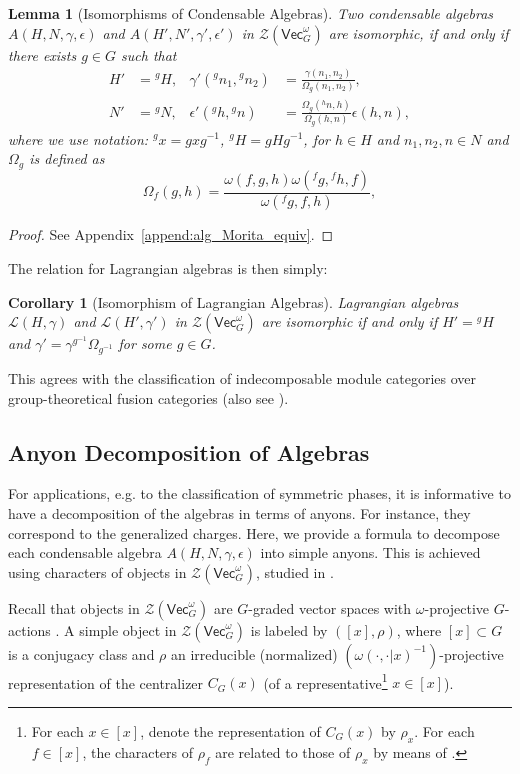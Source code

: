 \documentclass[aps,twocolumn,prx,floatfix,preprintnumbers, nofootinbib,10pt]{revtex4-2}
\numberwithin{equation}{section}
\newtheorem{lemma}[theorem]{Lemma}
\newtheorem{corollary}[theorem]{Corollary}
\theoremstyle{definition}
\newcommand{\be}{\begin{equation}}
\newcommand{\ee}{\end{equation}}
\newcommand{\ba}{\begin{aligned}}
\newcommand{\ea}{\end{aligned}}
\newcommand{\cL}{\mathcal{L}}
\newcommand{\cZ}{\mathcal{Z}}
\renewcommand{\Vec}{\mathsf{Vec}}
\newcommand{\Vect}{\mathsf{Vec}}
\newcommand{\eps}{\epsilon}
\begin{document}
\begin{lemma}[Isomorphisms of Condensable Algebras]
\label{lem:Morita_equiv}
    Two condensable algebras $A(H,N,\gamma,\epsilon)$ and $A(H',N',\gamma',\epsilon')$ in $\cZ(\Vec_G^\omega)$ are isomorphic, if and only if there exists $g\in G$ such that 
    \be\ba 
        H' & = {}^g\!H, & \gamma'({}^g n_1, {}^g n_2) & = \frac{\gamma(n_1,n_2)}{\Omega_g(n_1,n_2)},\\
        N' & = {}^g\!N, & \epsilon'({}^{g}h, {}^{g}n) & =\frac{\Omega_g({}^{h}n,h)}{\Omega_g(h,n)}\epsilon(h,n),\label{eqn:MoritaEq}
    \ea\ee
    where we use notation: ${}^{g}x = gxg^{-1}$, ${}^{g}\!H = gHg^{-1}$, for $h\in H$ and $n_1,n_2,n\in N$ and $\Omega_g$ is defined as 
    \be
    \Omega_f(g,h)=\frac{\omega(f,g,h)\omega({}^{f}\!g,{}^{f}h,f)}{\omega({}^{f}\!g,f,h)}, \label{eq:Omega_f}
    \ee
\end{lemma}
\begin{proof}
    See Appendix~\ref{append:alg_Morita_equiv}.
\end{proof}
The relation for Lagrangian algebras is then simply: 
\begin{corollary}[Isomorphism of Lagrangian Algebras]
    Lagrangian algebras $\cL(H, \gamma)$ and $\cL(H', \gamma')$ in $\cZ(\Vec_G^\omega)$ are isomorphic if and only if $H'={}^{g}\!H$ and  $\gamma'=\gamma^{g^{-1}}\Omega_{g^{-1}}$ for some $g\in G$. 
\end{corollary}
This agrees with the classification of indecomposable module categories over group-theoretical fusion categories \cite{Natale2017} (also see \cite{Ostrikmodule}).




\subsection{Anyon Decomposition of Algebras}  
\label{sec:AnyonDecomp}

For applications, e.g. to the classification of symmetric phases, it is informative to have a decomposition of the algebras in terms of anyons. For instance, they correspond to the generalized charges. 
Here, we provide a formula to decompose each condensable algebra $A(H,N,\gamma,\eps)$ into simple anyons. This is achieved using characters of objects in $\cZ(\Vec_G^\omega)$, studied in \cite{Bantay:1993ku, davydov2017lagrangian}. 

Recall that objects in $\cZ(\Vect_G^\omega)$ are $G$-graded vector spaces with $\omega$-projective $G$-actions \cite{davydov2017lagrangian}. A simple object in $\cZ(\Vec_G^\omega)$ is labeled by $([x],\rho)$, where $[x]\subset G$ is a conjugacy class 
and $\rho$ an irreducible (normalized) $(\omega(\cdot,\cdot|x)^{-1})$-projective representation of the centralizer $C_G(x)$ (of a representative\footnote{For each $x\in [x]$, denote the representation of $C_G(x)$ by $\rho_x$. For each $f\in[x]$, the characters of $\rho_f$ are related to those of $\rho_x$ by means of \cite[equation (2.10)]{gruen2021computing}. } $x\in [x]$).
\end{document}
